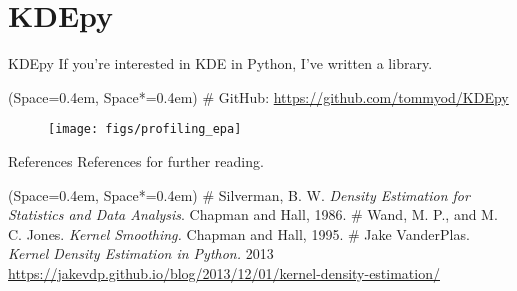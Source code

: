 \documentclass[11pt, aspectratio=149]{beamer}
\newcommand{\listSpace}{0.4em}
\theoremstyle{plain}
\begin{document}
\section{KDEpy}


\begin{frame}[fragile, t]{KDEpy}
	If you're interested in KDE in Python, I've written a library.
	\vspace{1em}
	\begin{easylist}[itemize]
		\ListProperties(Space=\listSpace, Space*=\listSpace)
		# GitHub: \url{https://github.com/tommyod/KDEpy}
	\end{easylist}
	\vfill
	\begin{figure}
		\centering
		\texttt{[image: figs/profiling\_epa]}
	\end{figure}
\end{frame}


\begin{frame}[fragile, t]{References}
	References for further reading.
	\vspace{1em}
	\begin{easylist}[itemize]
		\ListProperties(Space=\listSpace, Space*=\listSpace)
		# Silverman, B. W. \emph{Density Estimation for Statistics and Data Analysis}. Chapman and Hall, 1986.
		# Wand, M. P., and M. C. Jones. \emph{Kernel Smoothing.} Chapman and Hall, 1995.
		# Jake VanderPlas. \emph{Kernel Density Estimation in Python.} 2013 \\ \url{https://jakevdp.github.io/blog/2013/12/01/kernel-density-estimation/}
	\end{easylist}
\end{frame}
\end{document}
